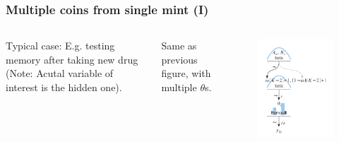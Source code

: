 \documentclass[usenames,dvipsnames,table]{beamer}
\begin{document}
\begin{frame}
\frametitle{Multiple coins from single mint (I)}
\begin{columns}[c]
Typical case: E.g. testing memory after taking new drug (Note: Acutal variable of interest is the hidden one).

\vspace{1em}
Same as previous figure, with multiple $\theta$s.

\begin{figure}
\centering
\includegraphics[height=0.8\textheight]{img/fig9_4}
\end{figure}
\end{columns}
\end{frame}
\end{document}
